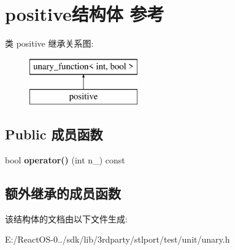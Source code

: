 \hypertarget{structpositive}{}\section{positive结构体 参考}
\label{structpositive}
类 positive 继承关系图\+:\begin{figure}[H]
\begin{center}
\leavevmode
\includegraphics[height=2.000000cm]{structpositive}
\end{center}
\end{figure}
\subsection*{Public 成员函数}
\begin{DoxyCompactItemize}
\item 
\mbox{\label{structpositive_a23346c550f0099bbd5d3d54fd61451fa}} 
bool {\bfseries operator()} (int n\+\_\+) const
\end{DoxyCompactItemize}
\subsection*{额外继承的成员函数}


该结构体的文档由以下文件生成\+:\begin{DoxyCompactItemize}
\item 
E\+:/\+React\+O\+S-\/0../sdk/lib/3rdparty/stlport/test/unit/unary.\+h\end{DoxyCompactItemize}
